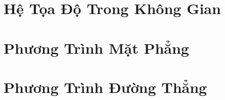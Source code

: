 \documentclass[oneside]{book}
\numberwithin{equation}{section}
\begin{document}
\section{Hệ Tọa Độ Trong Không Gian}


\section{Phương Trình Mặt Phẳng}


\section{Phương Trình Đường Thẳng}


\printbibliography[heading=bibintoc]
	
\end{document}
